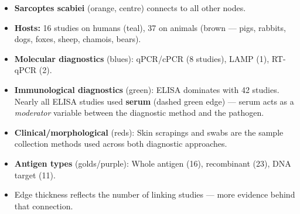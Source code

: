 \documentclass[
  letterpaper,
  DIV=11,
  numbers=noendperiod]{scrartcl}
\providecommand{\tightlist}{%
  \setlength{\itemsep}{0pt}\setlength{\parskip}{0pt}}
\begin{document}
\begin{itemize}
\tightlist
\item
  \textbf{Sarcoptes scabiei} (orange, centre) connects to all other
  nodes.
\item
  \textbf{Hosts:} 16 studies on humans (teal), 37 on animals (brown ---
  pigs, rabbits, dogs, foxes, sheep, chamois, bears).
\item
  \textbf{Molecular diagnostics} (blues): qPCR/cPCR (8 studies), LAMP
  (1), RT-qPCR (2).
\item
  \textbf{Immunological diagnostics} (green): ELISA dominates with 42
  studies. Nearly all ELISA studies used \textbf{serum} (dashed green
  edge) --- serum acts as a \emph{moderator} variable between the
  diagnostic method and the pathogen.
\item
  \textbf{Clinical/morphological} (reds): Skin scrapings and swabs are
  the sample collection methods used across both diagnostic approaches.
\item
  \textbf{Antigen types} (golds/purple): Whole antigen (16), recombinant
  (23), DNA target (11).
\item
  Edge thickness reflects the number of linking studies --- more
  evidence behind that connection.
\end{itemize}
\end{document}
